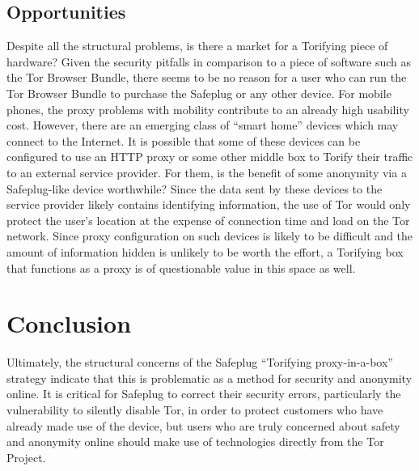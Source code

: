 \documentclass[letterpaper,twocolumn,10pt]{article}
\begin{document}
\subsection{Opportunities}
Despite all the structural problems, is there a market for a Torifying piece of hardware?  Given the security pitfalls in comparison to a piece of software such as the Tor Browser Bundle, there seems to be no reason for a user who can run the Tor Browser Bundle to purchase the Safeplug or any other device.  For mobile phones, the proxy problems with mobility contribute to an already high usability cost.  However, there are an emerging class of ``smart home'' devices which may connect to the Internet.  It is possible that some of these devices can be configured to use an HTTP proxy or some other middle box to Torify their traffic to an external service provider.  For them, is the benefit of some anonymity via a Safeplug-like device worthwhile?  Since the data sent by these devices to the service provider likely contains identifying information, the use of Tor would only protect the user's location at the expense of connection time and load on the Tor network.  Since proxy configuration on such devices is likely to be difficult and the amount of information hidden is unlikely to be worth the effort, a Torifying box that functions as a proxy is of questionable value in this space as well.

\section{Conclusion}
Ultimately, the structural concerns of the Safeplug ``Torifying proxy-in-a-box'' strategy indicate that this is problematic as a method for security and anonymity online.  It is critical for Safeplug to correct their security errors, particularly the vulnerability to silently disable Tor, in order to protect customers who have already made use of the device, but users who are truly concerned about safety and anonymity online should make use of technologies directly from the Tor Project.


{\footnotesize 
}
\end{document}
